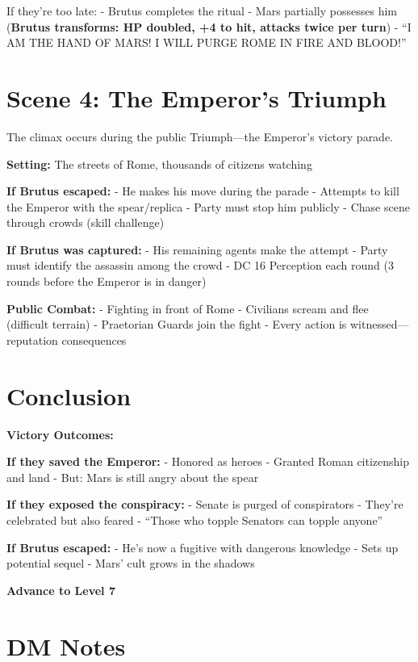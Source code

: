 \documentclass[
]{book}
\begin{document}
If they're too late: - Brutus completes the ritual - Mars partially
possesses him (\textbf{Brutus transforms: HP doubled, +4 to hit, attacks
twice per turn}) - ``I AM THE HAND OF MARS! I WILL PURGE ROME IN FIRE
AND BLOOD!''

\section{Scene 4: The Emperor's
Triumph}\label{scene-4-the-emperors-triumph}

The climax occurs during the public Triumph---the Emperor's victory
parade.

\textbf{Setting:} The streets of Rome, thousands of citizens watching

\textbf{If Brutus escaped:} - He makes his move during the parade -
Attempts to kill the Emperor with the spear/replica - Party must stop
him publicly - Chase scene through crowds (skill challenge)

\textbf{If Brutus was captured:} - His remaining agents make the attempt
- Party must identify the assassin among the crowd - DC 16 Perception
each round (3 rounds before the Emperor is in danger)

\textbf{Public Combat:} - Fighting in front of Rome - Civilians scream
and flee (difficult terrain) - Praetorian Guards join the fight - Every
action is witnessed---reputation consequences

\section{Conclusion}\label{conclusion-2}

\textbf{Victory Outcomes:}

\textbf{If they saved the Emperor:} - Honored as heroes - Granted Roman
citizenship and land - But: Mars is still angry about the spear

\textbf{If they exposed the conspiracy:} - Senate is purged of
conspirators - They're celebrated but also feared - ``Those who topple
Senators can topple anyone''

\textbf{If Brutus escaped:} - He's now a fugitive with dangerous
knowledge - Sets up potential sequel - Mars' cult grows in the shadows

\textbf{Advance to Level 7}

\section{DM Notes}\label{dm-notes-3}
\end{document}
